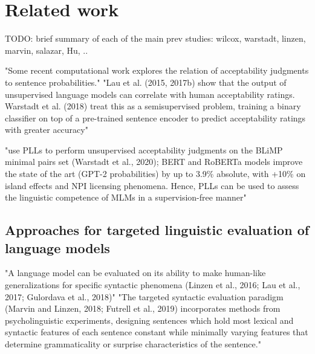 


\chapter{Related work}

TODO: brief summary of each of the main prev studies:
wilcox, warstadt, linzen, marvin, salazar, Hu, ..

"Some recent computational work explores the relation of acceptability judgments to sentence probabilities." \citep{lau2020furiously} 
"Lau et al. (2015, 2017b) show that the output of unsupervised language models can correlate with human acceptability ratings. Warstadt et al. (2018) treat this as a semisupervised problem, training a binary classifier on top of a pre-trained sentence encoder to predict acceptability ratings with greater accuracy"\citep{lau2020furiously} 

\citet{salazar2020masked}  "use PLLs to perform unsupervised acceptability judgments on the BLiMP minimal pairs set (Warstadt et al., 2020); BERT and RoBERTa models improve the state of the art (GPT-2 probabilities)
by up to 3.9\% absolute, with +10\% on island effects and NPI licensing phenomena. Hence, PLLs can be used to assess the linguistic competence of
MLMs in a supervision-free manner"


\section{Approaches for targeted linguistic evaluation of language models}


"A language model can be evaluated on its ability to make human-like generalizations for specific syntactic phenomena (Linzen et al., 2016; Lau et al., 2017; Gulordava et al., 2018)"  \citep{hu2020systematic}
"The targeted syntactic evaluation paradigm (Marvin and Linzen, 2018; Futrell et al., 2019) incorporates methods from psycholinguistic experiments,
designing sentences which hold most lexical and syntactic features of each sentence constant while minimally varying features that determine grammaticality or surprise characteristics of the sentence."  \citep{hu2020systematic}


